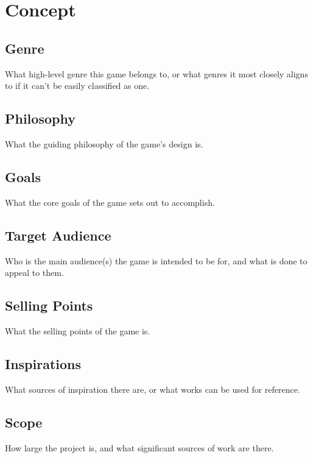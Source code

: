 

\newcommand{\gddTitle}{Game Name}
\newcommand{\gddSubtitle}{Game Subtitle}
\newcommand{\gddCompany}{Company Name}
\newcommand{\gddAuthors}{Firstname Lastname, Firstname Lastname, Firstname Lastname}
\newcommand{\gddDate}{January 1st, 1960}
\newcommand{\gddVersion}{1.0.0}

\newcommand{\gddChangelogEntries}{
\gddChangelogEntry{0.1.0}{January 1st, 1960}{New Version}
\gddChangelogEntry{0.0.1}{January 1st, 1960}{Changelog Modified}
\gddChangelogEntry{0.0.0}{January 1st, 1960}{Changelog Created}
}



\gddTitlepage
\gddChangelog

\section{Concept}
\subsection{Genre}
What high-level genre this game belongs to, or what genres it most closely aligns to if it can't be easily classified as one.
\subsection{Philosophy}
What the guiding philosophy of the game's design is.
\subsection{Goals}
What the core goals of the game sets out to accomplish.
\subsection{Target Audience}
Who is the main audience(s) the game is intended to be for, and what is done to appeal to them.
\subsection{Selling Points}
What the selling points of the game is.
\subsection{Inspirations}
What sources of inspiration there are, or what works can be used for reference.
\subsection{Scope}
How large the project is, and what significant sources of work are there.

